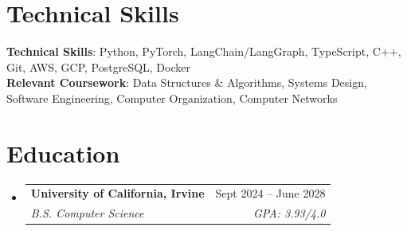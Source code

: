 \documentclass[letterpaper,11pt]{article}
\makeatletter
\newcommand{\resumeSubheading}[4]{
  \vspace{-2pt}\item
    \begin{tabular*}{0.97\textwidth}[t]{l@{\extracolsep{\fill}}r}
      \textbf{#1} & #2 \\
      \textit{\small#3} & \textit{\small #4} \\
    \end{tabular*}\vspace{-7pt}
}
\newcommand{\resumeSubHeadingListStart}{\begin{itemize}[leftmargin=0.15in, label={}]}
\newcommand{\resumeSubHeadingListEnd}{\end{itemize}}
\makeatother
\begin{document}
\section{Technical Skills}
 \begin{itemize}[leftmargin=0.15in, label={}]
    \small{\item{
     \textbf{Technical Skills}{: Python, PyTorch, LangChain/LangGraph, TypeScript, C++, Git, AWS, GCP, PostgreSQL, Docker} \\
     \textbf{Relevant Coursework}{: Data Structures \& Algorithms, Systems Design, Software Engineering, Computer Organization, Computer Networks}
    }}
 \end{itemize}


\section{Education}
  \resumeSubHeadingListStart
    \resumeSubheading
      {University of California, Irvine}{Sept 2024 -- June 2028}
      {B.S. Computer Science}{GPA: 3.93/4.0}
  \resumeSubHeadingListEnd


\end{document}
